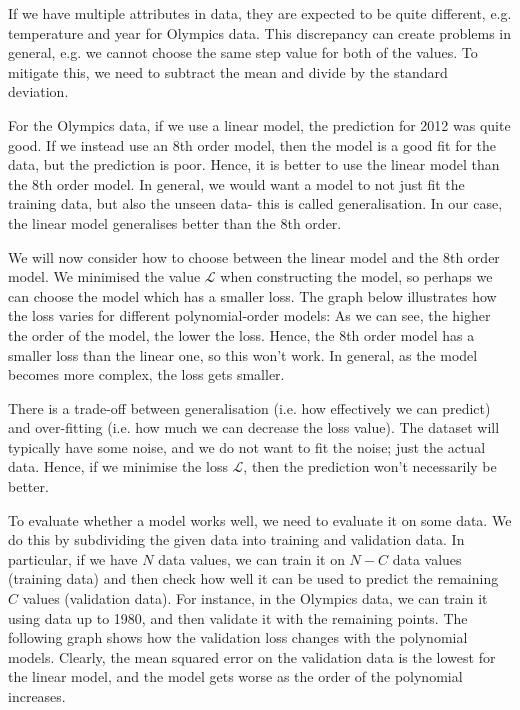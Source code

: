 \documentclass[a4paper, openany]{memoir}
\begin{document}
    If we have multiple attributes in data, they are expected to be quite different, e.g. temperature and year for Olympics data. This discrepancy can create problems in general, e.g. we cannot choose the same step value for both of the values. To mitigate this, we need to subtract the mean and divide by the standard deviation.

    For the Olympics data, if we use a linear model, the prediction for 2012 was quite good. If we instead use an 8th order model, then the model is a good fit for the data, but the prediction is poor. Hence, it is better to use the linear model than the 8th order model. In general, we would want a model to not just fit the training data, but also the unseen data- this is called generalisation. In our case, the linear model generalises better than the 8th order.

    We will now consider how to choose between the linear model and the 8th order model. We minimised the value $\mathcal{L}$ when constructing the model, so perhaps we can choose the model which has a smaller loss. The graph below illustrates how the loss varies for different polynomial-order models:
    As we can see, the higher the order of the model, the lower the loss. Hence, the 8th order model has a smaller loss than the linear one, so this won't work. In general, as the model becomes more complex, the loss gets smaller.

    There is a trade-off between generalisation (i.e. how effectively we can predict) and over-fitting (i.e. how much we can decrease the loss value). The dataset will typically have some noise, and we do not want to fit the noise; just the actual data. Hence, if we minimise the loss $\mathcal{L}$, then the prediction won't necessarily be better. 
    
    To evaluate whether a model works well, we need to evaluate it on some data. We do this by subdividing the given data into training and validation data. In particular, if we have $N$ data values, we can train it on $N - C$ data values (training data) and then check how well it can be used to predict the remaining $C$ values (validation data). For instance, in the Olympics data, we can train it using data up to 1980, and then validate it with the remaining points. The following graph shows how the validation loss changes with the polynomial models.
    Clearly, the mean squared error on the validation data is the lowest for the linear model, and the model gets worse as the order of the polynomial increases.
\end{document}
